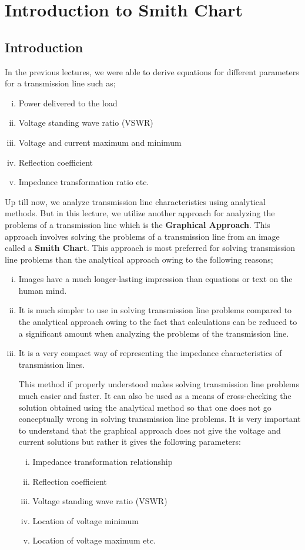 \chapter{Introduction to Smith Chart}\label{lec:lec7}
\section{Introduction}
In the previous lectures, we were able to derive equations for different parameters for a transmission line such as;
\begin{enumerate}[(i)]
\item 	Power delivered to the load
\item	Voltage standing wave ratio (VSWR)
\item	Voltage and current maximum and minimum
\item	Reflection coefficient
\item	Impedance transformation ratio etc.
\end{enumerate}

Up till now, we analyze transmission line characteristics using analytical methods. But in this lecture, we utilize another approach for analyzing the problems of a transmission line which is the \textbf{Graphical Approach}.
This approach involves solving the problems of a transmission line from an image called a \textbf{Smith Chart}.
This approach is most preferred for solving transmission line problems than the analytical approach owing to the following reasons;\\
\begin{enumerate}[(i)]
\item Images have a much longer-lasting impression than equations or text on the human mind.
\item	It is much simpler to use in solving transmission line problems compared to the analytical approach owing to the fact that calculations can be reduced to a significant amount when analyzing the problems of the transmission line.
\item	It is a very compact way of representing the impedance characteristics of transmission lines.

This method if properly understood makes solving transmission line problems much easier and faster.  It can also be used as a means of cross-checking the solution obtained using the analytical method so that one does not go conceptually wrong in solving transmission line problems.
It is very important to understand that the graphical approach does not give the voltage and current solutions but rather it gives the following parameters:
\begin{enumerate}[(i)]
\item	Impedance transformation relationship 
\item Reflection coefficient
\item Voltage standing wave ratio (VSWR)
\item Location of voltage minimum
\item	Location of voltage maximum etc.
\end{enumerate}
\end{enumerate}

